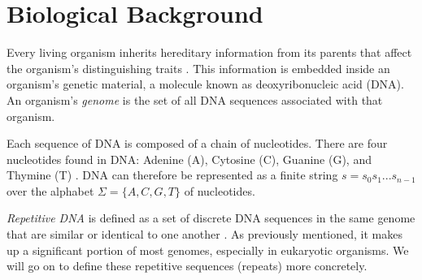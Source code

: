 \section{Biological Background}
Every living organism inherits hereditary information from its parents that affect the organism's distinguishing traits \cite{lewin2014lewins}. This information is embedded inside an organism's genetic material, a molecule known as deoxyribonucleic acid (DNA). An organism's \textit{genome} is the set of all DNA sequences associated with that organism.

Each sequence of DNA is composed of a chain of nucleotides. There are four nucleotides found in DNA: Adenine (A), Cytosine (C), Guanine (G), and Thymine (T)  \cite{elloumi2011algorithms}. DNA can therefore be represented as a finite string $s=s_{0}s_{1}...s_{n-1}$ over the alphabet $\Sigma=\lbrace A, C, G, T\rbrace$ of nucleotides.

\textit{Repetitive DNA} is defined as a set of discrete DNA sequences in the same genome that are similar or identical to one another \cite{treangen2012repetitive}. As previously mentioned, it makes up a significant portion of most genomes, especially in eukaryotic organisms. We will go on to define these repetitive sequences (repeats) more concretely. 
  
 


